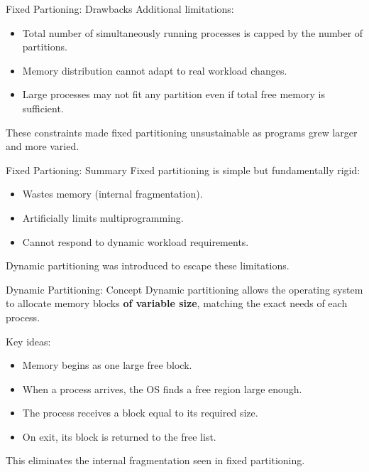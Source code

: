 \documentclass[11pt]{beamer}
\begin{document}
    \begin{frame}[t]{Fixed Partioning: Drawbacks}
        Additional limitations:
        \begin{itemize}
            \item Total number of simultaneously running processes
            is capped by the number of partitions.
            \item Memory distribution cannot adapt to real workload changes.
            \item Large processes may not fit any partition even if total free
            memory is sufficient.
        \end{itemize}

        \medskip
        These constraints made fixed partitioning unsustainable as programs grew larger and more varied.
    \end{frame}


    \begin{frame}[t]{Fixed Partioning: Summary}
        Fixed partitioning is simple but fundamentally rigid:
        \begin{itemize}
            \item Wastes memory (internal fragmentation).
            \item Artificially limits multiprogramming.
            \item Cannot respond to dynamic workload requirements.
        \end{itemize}

        \medskip
        Dynamic partitioning was introduced to escape these limitations.
    \end{frame}

    \begin{frame}[t]{Dynamic Partitioning: Concept}
        Dynamic partitioning allows the operating system to allocate memory blocks
        \textbf{of variable size}, matching the exact needs of each process.

        \medskip

        Key ideas:
        \begin{itemize}
            \item Memory begins as one large free block.
            \item When a process arrives, the OS finds a free region large enough.
            \item The process receives a block equal to its required size.
            \item On exit, its block is returned to the free list.
        \end{itemize}

        \medskip
        This eliminates the internal fragmentation seen in fixed partitioning.
    \end{frame}
\end{document}
